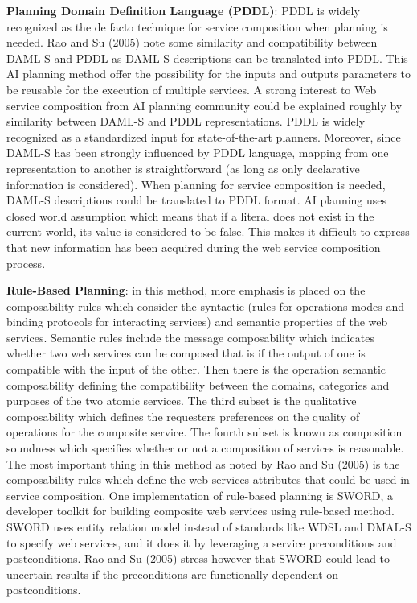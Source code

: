 \documentclass{article}
\begin{document}
\begin{itemize}
\textbf{Planning Domain Definition Language (PDDL)}: PDDL is widely recognized as the de facto technique for service composition when planning is needed. Rao and Su (2005) note some similarity and compatibility between DAML-S and PDDL as DAML-S descriptions can be translated into PDDL. This AI planning method offer the possibility for the inputs and outputs parameters to be reusable for the execution of multiple services. A strong interest to Web service composition from AI planning community could be explained roughly by similarity between DAML-S and PDDL representations. PDDL is widely recognized as a standardized input for state-of-the-art planners. Moreover, since DAML-S has been strongly influenced by PDDL language, mapping from one representation to another is straightforward (as long as only declarative information is considered). When planning for service composition is needed, DAML-S descriptions could be translated to PDDL format. AI planning uses closed world assumption which means that if a literal does not exist in the current world, its value is considered to be false. This makes it difficult to express that new information has been acquired during the web service composition process. 

\textbf{Rule-Based Planning}: in this method, more emphasis is placed on the composability rules which consider the syntactic (rules for operations modes and binding protocols for interacting services) and semantic properties of the web services. Semantic rules include the message composability which indicates whether two web services can be composed that is if the output of one is compatible with the input of the other. Then there is the operation semantic composability defining the compatibility between the domains, categories and purposes of the two atomic services. The third subset is the qualitative composability which defines the requesters preferences on the quality of operations for the composite service. The fourth subset is known as composition soundness which specifies whether or not a composition of services is reasonable. The most important thing in this method as noted by Rao and Su (2005) is the composability rules which define the web services attributes that could be used in service composition. One implementation of rule-based planning is SWORD, a developer toolkit for building composite web services using rule-based method. SWORD uses entity relation model instead of standards like WDSL and DMAL-S to specify web services, and it does it by leveraging a service preconditions and postconditions. Rao and Su (2005) stress however that SWORD could lead to uncertain results if the preconditions are functionally dependent on postconditions.


\end{itemize}
\end{document}

